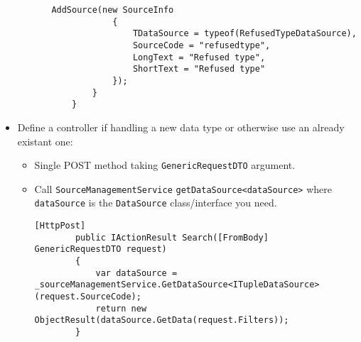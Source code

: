 \begin{itemize}
\begin{itemize}
\begin{itemize}
\begin{lstlisting}[caption={TupleDiscoveryConfiguration example}, style=javaScriptCode]
            AddSource(new SourceInfo
            {
                TDataSource = typeof(RefusedTypeDataSource),
                SourceCode = "refusedtype",
                LongText = "Refused type",
                ShortText = "Refused type"
            });
        }
    }                
            \end{lstlisting}
        \end{itemize}
    \end{itemize}
    \item Define a controller if handling a new data type or otherwise use an already existant one:
    \begin{itemize}
        \item Single POST method taking \verb|GenericRequestDTO| argument.
        \item Call \verb|SourceManagementService| \verb|getDataSource<dataSource>| where \verb|dataSource| is the \verb|DataSource| class/interface you need.
        \begin{lstlisting}[caption={NON SO COSA METTERE example}, style=javaScriptCode]
        [HttpPost]
        public IActionResult Search([FromBody] GenericRequestDTO request)
        {
            var dataSource = _sourceManagementService.GetDataSource<ITupleDataSource>(request.SourceCode);
            return new ObjectResult(dataSource.GetData(request.Filters));
        }
        \end{lstlisting}
    \end{itemize}
\end{itemize}
